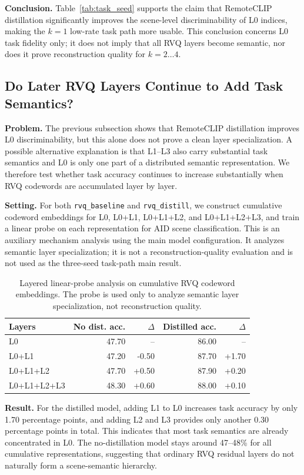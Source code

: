 \documentclass[lettersize,journal]{IEEEtran}
\begin{document}
\textbf{Conclusion.} Table~\ref{tab:task_seed} supports the claim that RemoteCLIP distillation significantly improves the scene-level discriminability of L0 indices, making the $k=1$ low-rate task path more usable. This conclusion concerns L0 task fidelity only; it does not imply that all RVQ layers become semantic, nor does it prove reconstruction quality for $k=2\ldots4$.

\subsection{Do Later RVQ Layers Continue to Add Task Semantics?}
\textbf{Problem.} The previous subsection shows that RemoteCLIP distillation improves L0 discriminability, but this alone does not prove a clean layer specialization. A possible alternative explanation is that L1--L3 also carry substantial task semantics and L0 is only one part of a distributed semantic representation. We therefore test whether task accuracy continues to increase substantially when RVQ codewords are accumulated layer by layer.

\textbf{Setting.} For both \texttt{rvq\_baseline} and \texttt{rvq\_distill}, we construct cumulative codeword embeddings for L0, L0+L1, L0+L1+L2, and L0+L1+L2+L3, and train a linear probe on each representation for AID scene classification. This is an auxiliary mechanism analysis using the main model configuration. It analyzes semantic layer specialization; it is not a reconstruction-quality evaluation and is not used as the three-seed task-path main result.

\begin{table}[!t]
\centering
\caption{Layered linear-probe analysis on cumulative RVQ codeword embeddings. The probe is used only to analyze semantic layer specialization, not reconstruction quality.}
\label{tab:layer_probe}
\begin{tabular}{@{}lrrrr@{}}
\toprule
Layers & No dist. acc. & $\Delta$ & Distilled acc. & $\Delta$ \\
\midrule
L0 & 47.70 & -- & 86.00 & -- \\
L0+L1 & 47.20 & -0.50 & 87.70 & +1.70 \\
L0+L1+L2 & 47.70 & +0.50 & 87.90 & +0.20 \\
L0+L1+L2+L3 & 48.30 & +0.60 & 88.00 & +0.10 \\
\bottomrule
\end{tabular}
\end{table}

\textbf{Result.} For the distilled model, adding L1 to L0 increases task accuracy by only 1.70 percentage points, and adding L2 and L3 provides only another 0.30 percentage points in total. This indicates that most task semantics are already concentrated in L0. The no-distillation model stays around 47--48\% for all cumulative representations, suggesting that ordinary RVQ residual layers do not naturally form a scene-semantic hierarchy.
\end{document}
